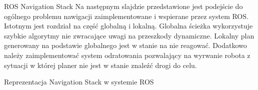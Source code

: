 \begin{frame}
{ROS Navigation Stack}
	Na następnym slajdzie przedstawione jest podejście do ogólnego problemu nawigacji zaimplementowane i wspierane przez system ROS. 
	Istotnym jest rozdział na część globalną i lokalną.
	Globalna ścieżka wykorzystuje szybkie algorytmy nie zwracające uwagi na przeszkody dynamiczne.
	Lokalny plan generowany na podstawie globalnego jest w stanie na nie reagować.
	Dodatkowo należy zaimplementować system odratowania pozwalający na wyrwanie robota z sytuacji w której planer nie jest w stanie znaleźć drogi do celu.
\end{frame}

\begin{frame}
{Reprezentacja Navigation Stack w systemie ROS}
\end{frame}